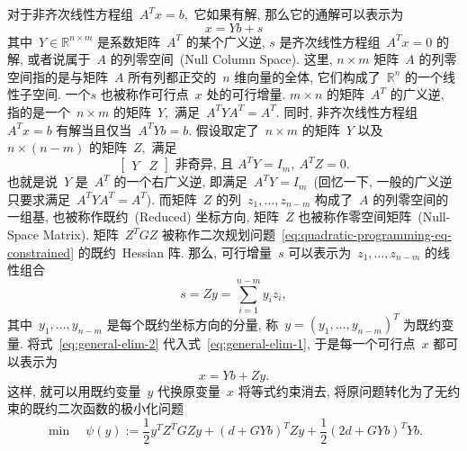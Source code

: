 对于非齐次线性方程组~$A^T {x} = {b},$ 它如果有解, 那么它的通解可以表示为
\begin{equation}
\label{eq:general-elim-1}
{x} = Y {b} + {s}
\end{equation}
其中~$Y \in \mathbb{R}^{n\times m}$ 是系数矩阵~$A^T$ 的某个广义逆, ${s}$ 是齐次线性方程组~$A^T {x} = 0$ 的解, 或者说属于~$A$ 的列零空间~(Null Column Space). 这里, $n\times m$ 矩阵~$A$ 的列零空间指的是与矩阵~$A$ 所有列都正交的~$n$ 维向量的全体, 它们构成了~$\mathbb{R}^{n}$ 的一个线性子空间. 一个${s}$ 也被称作可行点~${x}$ 处的可行增量. $m\times n$ 的矩阵~$A^T$ 的广义逆, 指的是一个~$n\times m$ 的矩阵~$Y,$ 满足~$A^T Y A^T = A^T.$ 同时, 非齐次线性方程组~$A^T {x} = {b}$ 有解当且仅当~$A^T Y {b} = {b}.$ 假设取定了~$n \times m$ 的矩阵~$Y$ 以及~$n \times (n-m)$ 的矩阵~$Z,$ 满足
\begin{equation}
\label{eq:eq:general-elim-req}
\begin{bmatrix} Y & Z\end{bmatrix} \text{ 非奇异, 且~} A^T Y = I_m, ~ A^T Z = 0.
\end{equation}
也就是说~$Y$ 是~$A^T$ 的一个右广义逆, 即满足~$A^T Y = I_m$~(回忆一下, 一般的广义逆只要求满足~$A^T Y A^T = A^T$). 而矩阵~$Z$ 的列~${z}_1, \ldots, {z}_{n-m}$ 构成了~$A$ 的列零空间的一组基,
也被称作既约~(Reduced) 坐标方向, 矩阵~$Z$ 也被称作零空间矩阵~(Null-Space Matrix). 矩阵~$Z^T G Z$ 被称作二次规划问题~\eqref{eq:quadratic-programming-eq-constrained} 的既约~Hessian 阵. 那么,
可行增量~${s}$ 可以表示为~${z}_1, \ldots, {z}_{n-m}$ 的线性组合
\begin{equation}
\label{eq:general-elim-2}
{s} = Z {y} = \sum\limits_{i=1}^{n-m} y_i {z}_i,
\end{equation}
其中~$y_1, \ldots, y_{n-m}$ 是每个既约坐标方向的分量, 称~${y} = (y_1, \ldots, y_{n-m})^T$ 为既约变量. 将式~\eqref{eq:general-elim-2} 代入式~\eqref{eq:general-elim-1}, 于是每一个可行点~${x}$ 都可以表示为
\begin{equation}
\label{eq:general-elim-3}
{x} = Y {b} + Z {y}.
\end{equation}
这样, 就可以用既约变量~${y}$ 代换原变量~${x}$ 将等式约束消去, 将原问题转化为了无约束的既约二次函数的极小化问题
\begin{equation}
\label{eq:general-elim-4}
\min \quad \psi({y}) := \frac{1}{2} {y}^T Z^T G Z {y} + \left( {d} + G Y {b} \right)^T Z {y} + \frac{1}{2} \left( 2{d} + G Y {b} \right)^T Y {b}.
\end{equation}


